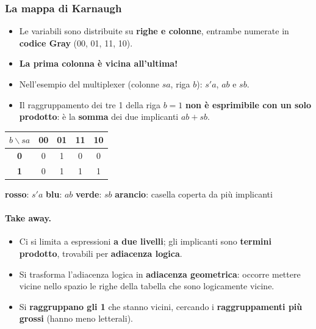 \documentclass[12pt, a4paper]{article}
\begin{document}
\subsubsection{La mappa di Karnaugh}
\begin{itemize}
    \item Le variabili sono distribuite su \textbf{righe e colonne}, entrambe numerate in \textbf{codice Gray} (00, 01, 11, 10).
    \item \textbf{La prima colonna è vicina all'ultima!}
    \item Nell'esempio del multiplexer (colonne $sa$, riga $b$): $s'a$, $ab$ e $sb$.
    \item Il raggruppamento dei tre 1 della riga $b = 1$ \textbf{non è esprimibile con un solo prodotto}: è la \textbf{somma} dei due implicanti $ab + sb$.
\end{itemize}

\begin{center}
\renewcommand{\arraystretch}{1.25}
\begin{tabular}[t]{|c|c|c|c|c|}
\hline
\colorbox{gray!25}{\color{black}$b\backslash sa$} & \colorbox{gray!25}{\color{black}\textbf{00}} & \colorbox{gray!25}{\color{black}\textbf{01}} & \colorbox{gray!25}{\color{black}\textbf{11}} & \colorbox{gray!25}{\color{black}\textbf{10}} \\ \hline
\colorbox{gray!25}{\color{black}\textbf{0}} & 0 & \colorbox{red!25}{\color{black}1} & 0 & 0 \\ \hline
\colorbox{gray!25}{\color{black}\textbf{1}} & 0 & \colorbox{orange!55}{\color{black}1} & \colorbox{orange!55}{\color{black}1} & \colorbox{green!30}{\color{black}1} \\ \hline
\end{tabular}
\end{center}
\begin{center}
\textcolor{red!80!black}{\textbf{rosso}}: $s'a$ \qquad \textcolor{blue!70!black}{\textbf{blu}}: $ab$ \qquad \textcolor{green!50!black}{\textbf{verde}}: $sb$ \qquad \textcolor{orange!90!black}{\textbf{arancio}}: casella coperta da più implicanti
\end{center}

\paragraph{Take away.}
\begin{itemize}
    \item Ci si limita a espressioni \textbf{a due livelli}; gli implicanti sono \textbf{termini prodotto}, trovabili per \textbf{adiacenza logica}.
    \item Si trasforma l'adiacenza logica in \textbf{adiacenza geometrica}: occorre mettere vicine nello spazio le righe della tabella che sono logicamente vicine.
    \item Si \textbf{raggruppano gli 1} che stanno vicini, cercando i \textbf{raggruppamenti più grossi} (hanno meno letterali).
\end{itemize}
\end{document}
